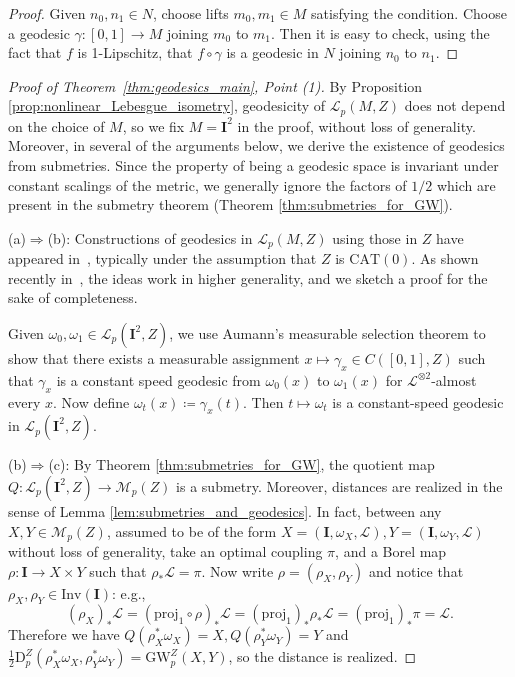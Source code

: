 \documentclass{article}
\theoremstyle{definition}
\newcommand{\M}{\mathcal{M}}
\newcommand{\MZp}{\M_p(Z)}
\newcommand{\dgwz}{\mathrm{GW}_p^Z}
\newcommand{\Lp}{\mathcal{L}_p}
\newcommand{\dpz}{\mathrm{D}^Z_p}
\begin{document}
\begin{proof}
    Given $n_0,n_1 \in N$, choose lifts $m_0,m_1 \in M$ satisfying the condition. Choose a geodesic $\gamma:[0,1] \to M$ joining $m_0$ to $m_1$. Then it is easy to check, using the fact that $f$ is 1-Lipschitz, that $f \circ \gamma$ is a geodesic in $N$ joining $n_0$ to $n_1$. 
\end{proof}


\begin{proof}[Proof of Theorem~\ref{thm:geodesics_main}, Point (1)]
By Proposition \ref{prop:nonlinear_Lebesgue_isometry}, geodesicity of $\Lp(M,Z)$ does not depend on the choice of $M$, so we fix $M = \mathbf{I}^2$ in the proof, without loss of generality. Moreover, in several of the arguments below, we derive the existence of geodesics from submetries. Since the property of being a geodesic space is invariant under constant scalings of the metric, we generally ignore the factors of $1/2$ which are present in the submetry theorem (Theorem \ref{thm:submetries_for_GW}).

(a)$\Rightarrow$(b): Constructions of geodesics in $\Lp(M,Z)$ using those in $Z$ have appeared in~\cite{sturm2003probability,korevaar1993sobolev,jost1994equilibrium}, typically under the assumption that $Z$ is $\mathrm{CAT}(0)$. As shown recently in~\cite[Proposition 4.4]{serieys2026nonlinear}, the ideas work in higher generality, and we sketch a proof for the sake of completeness. 
%
%
%
%
%
%
%

Given $\omega_0,\omega_1\in \Lp(\mathbf{I}^2,Z)$, we use Aumann's measurable selection theorem \cite[Theorem B.9]{serieys2026nonlinear} to show that there exists a measurable assignment $x\mapsto \gamma_{x}\in C([0,1],Z)$ such that $\gamma_x$ is a constant speed geodesic from $\omega_0(x)$ to $\omega_1(x)$ for $\mathscr{L}^{\otimes2}$-almost every $x$. Now define $\omega_t(x)\coloneqq\gamma_x(t)$. 
Then $t\mapsto \omega_t$ is a constant-speed geodesic in $\Lp(\mathbf{I}^2,Z)$. 

(b)$\Rightarrow$(c): By Theorem \ref{thm:submetries_for_GW}, the quotient map $Q:\Lp(\mathbf{I}^2,Z) \to \MZp$ is a submetry. Moreover, distances are realized in the sense of Lemma \ref{lem:submetries_and_geodesics}. In fact, between any $X, Y\in \MZp$, assumed to be of the form $X=(\mathbf{I},\omega_X,\mathscr{L}),Y=(\mathbf{I},\omega_Y,\mathscr{L})$ without loss of generality, take an optimal coupling $\pi$, and a Borel map $\rho:\mathbf{I}\to X\times Y$ such that $\rho_*\mathscr{L}=\pi$. Now write $\rho=(\rho_X,\rho_Y)$ and notice that $\rho_X,\rho_Y\in \mathrm{Inv}(\mathbf{I})$: e.g., 
\[
(\rho_X)_\ast \mathscr{L} = (\mathrm{proj}_1 \circ \rho)_\ast \mathscr{L} = (\mathrm{proj}_1)_\ast \rho_\ast \mathscr{L} = (\mathrm{proj}_1)_\ast \pi = \mathscr{L}.
\]
Therefore we have $Q(\rho_X^*\omega_X)=X,Q(\rho_Y^*\omega_Y)=Y$ and $\frac{1}{2}\dpz(\rho_X^*\omega_X,\rho_Y^*\omega_Y)=\dgwz(X,Y)$, so the distance is realized.
    



\end{proof}
\end{document}
